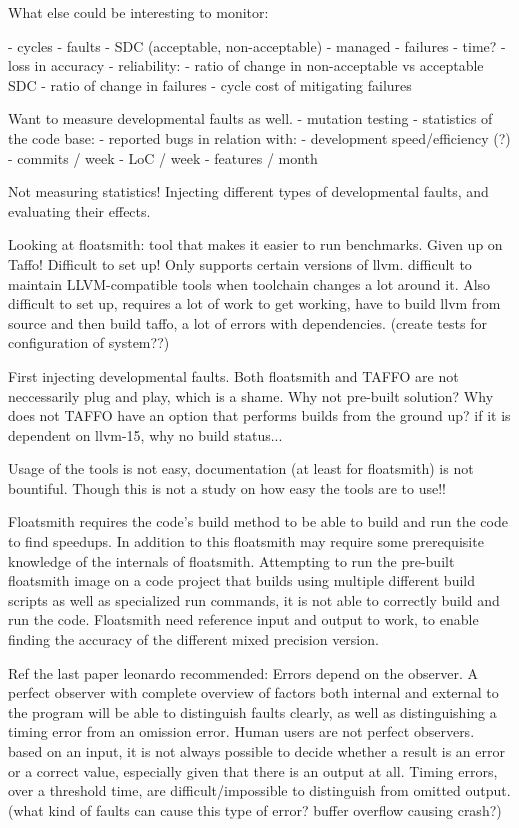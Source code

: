 What else could be interesting to monitor:

- cycles
- faults
    - SDC (acceptable, non-acceptable)
    - managed
    - failures
- time?
- loss in accuracy
- reliability:
    - ratio of change in non-acceptable vs acceptable SDC
    - ratio of change in failures
    - cycle cost of mitigating failures


Want to measure developmental faults as well. 
    - mutation testing
    - statistics of the code base:
        - reported bugs
        in relation with:
        - development speed/efficiency (?) 
            - commits / week
            - LoC / week
            - features / month

    Not measuring statistics! 
    Injecting different types of developmental faults, and evaluating their effects.

Looking at floatsmith: tool that makes it easier to run benchmarks. Given up on Taffo! Difficult to set up! Only supports certain versions of llvm. difficult to maintain LLVM-compatible tools when toolchain changes a lot around it. Also difficult to set up, requires a lot of work to get working, have to build llvm from source and then build taffo, a lot of errors with dependencies. (create tests for configuration of system??)


First injecting developmental faults.  
Both floatsmith and TAFFO are not neccessarily plug and play, which is a shame. Why not pre-built solution? Why does not TAFFO have an option that performs builds from the ground up? if it is dependent on llvm-15, why no build status...


Usage of the tools is not easy, documentation (at least for floatsmith) is not bountiful. Though this is not a study on how easy the tools are to use!!

Floatsmith requires the code's build method to be able to build and run the code to find speedups. In addition to this floatsmith may require some prerequisite knowledge of the internals of floatsmith. Attempting to run the pre-built floatsmith image on a code project that builds using multiple different build scripts as well as specialized run commands, it is not able to correctly build and run the code. Floatsmith need reference input and output to work, to enable finding the accuracy of the different mixed precision version. 

Ref the last paper leonardo recommended:
Errors depend on the observer. A perfect observer with complete overview of factors both internal and external to the program will be able to distinguish faults clearly, as well as distinguishing a timing error from an omission error.
Human users are not perfect observers. based on an input, it is not always possible to decide whether a result is an error or a correct value, especially given that there is an output at all. 
Timing errors, over a threshold time, are difficult/impossible to distinguish from omitted output.  (what kind of faults can cause this type of error? buffer overflow causing crash?)

